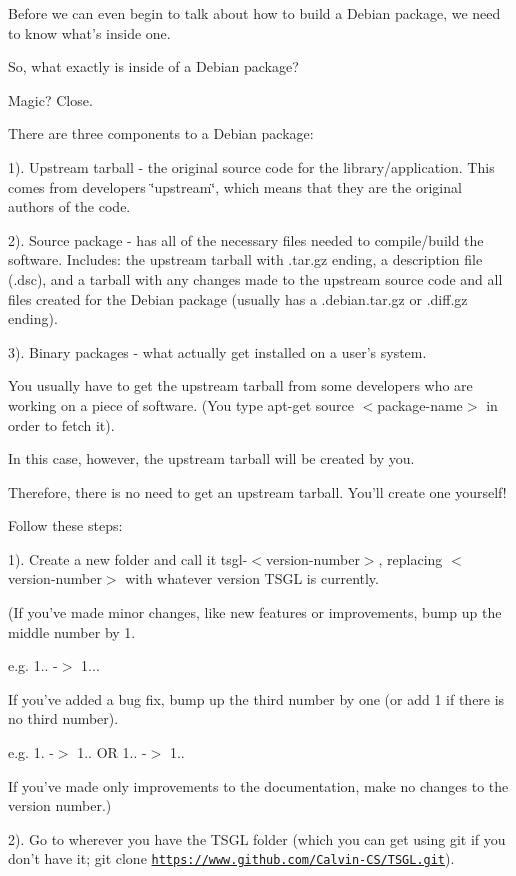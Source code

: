 Before we can even begin to talk about how to build a Debian package, we need to know what's inside one.

So, what exactly is inside of a Debian package?

Magic? Close.

There are three components to a Debian package\-:

1). Upstream tarball -\/ the original source code for the library/application. This comes from developers \char`\"{}upstream\char`\"{}, which means that they are the original authors of the code.

2). Source package -\/ has all of the necessary files needed to compile/build the software. Includes\-: the upstream tarball with {\ttfamily .tar.\-gz} ending, a description file ({\ttfamily .dsc}), and a tarball with any changes made to the upstream source code and all files created for the Debian package (usually has a {\ttfamily .debian.\-tar.\-gz} or {\ttfamily .diff.\-gz} ending).

3). Binary packages -\/ what actually get installed on a user's system.

You usually have to get the upstream tarball from some developers who are working on a piece of software. (You type {\ttfamily apt-\/get source $<$package-\/name$>$} in order to fetch it).

In this case, however, the upstream tarball will be created by you.

Therefore, there is no need to get an upstream tarball. You'll create one yourself!

Follow these steps\-:

1). Create a new folder and call it {\ttfamily tsgl-\/$<$version-\/number$>$}, replacing {\ttfamily $<$version-\/number$>$} with whatever version T\-S\-G\-L is currently.

(If you've made minor changes, like new features or improvements, bump up the middle number by 1.

e.\-g. 1.. -\/$>$ 1...

If you've added a bug fix, bump up the third number by one (or add 1 if there is no third number).

e.\-g. 1. -\/$>$ 1.. O\-R 1.. -\/$>$ 1..

If you've made only improvements to the documentation, make no changes to the version number.)

2). Go to wherever you have the T\-S\-G\-L folder (which you can get using git if you don't have it; {\ttfamily git clone \href{https://www.github.com/Calvin-CS/TSGL.git}{\tt https\-://www.\-github.\-com/\-Calvin-\/\-C\-S/\-T\-S\-G\-L.\-git}}).

